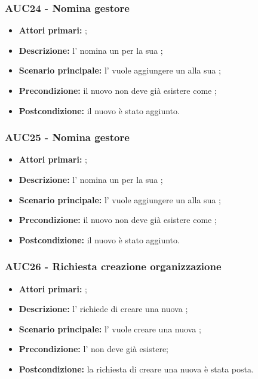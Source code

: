 \documentclass[casi-duso]{subfiles}
\begin{document}
\subsubsection{AUC24 - Nomina gestore}
\label{subsub:AUC24}
\begin{itemize}
  \item \textbf{Attori primari:} ;
  \item \textbf{Descrizione:} l'  nomina un  per la sua ;
  \item \textbf{Scenario principale:} l'  vuole aggiungere un  alla sua ;
  \item \textbf{Precondizione:} il nuovo  non deve già esistere come ;
  \item \textbf{Postcondizione:} il nuovo  è stato aggiunto.
\end{itemize}

\subsubsection{AUC25 - Nomina gestore}
\label{subsub:AUC25}
\begin{itemize}
  \item \textbf{Attori primari:} ;
  \item \textbf{Descrizione:} l'  nomina un  per la sua ;
  \item \textbf{Scenario principale:} l'  vuole aggiungere un  alla sua ;
  \item \textbf{Precondizione:} il nuovo  non deve già esistere come ;
  \item \textbf{Postcondizione:} il nuovo  è stato aggiunto.
\end{itemize}

\subsubsection{AUC26 - Richiesta creazione organizzazione}
\label{subsub:AUC26}
\begin{itemize}
  \item \textbf{Attori primari:} ;
  \item \textbf{Descrizione:} l'  richiede di creare una nuova ;
  \item \textbf{Scenario principale:} l'  vuole creare una nuova ;
  \item \textbf{Precondizione:} l'  non deve già esistere;
  \item \textbf{Postcondizione:} la richiesta di creare una nuova  è stata posta.
\end{itemize}
\end{document}
